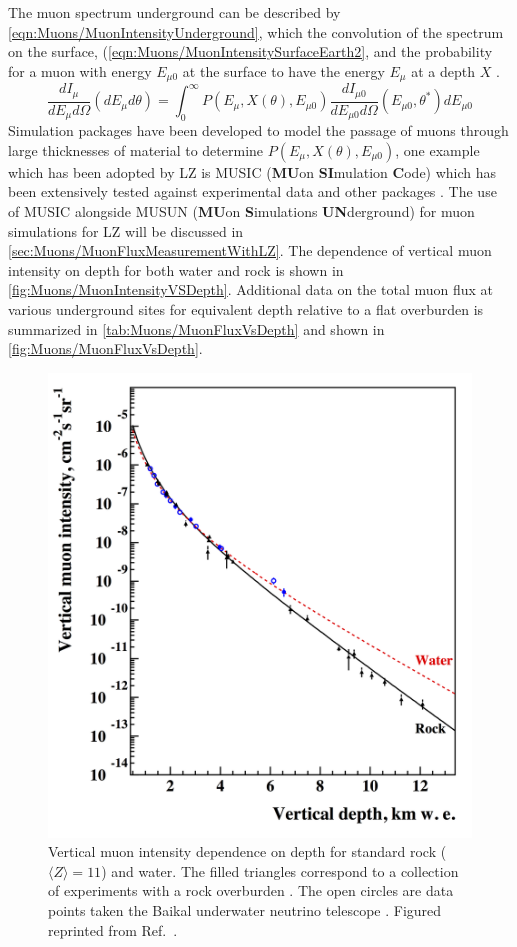 The muon spectrum underground can be described by \autoref{eqn:Muons/MuonIntensityUnderground}, which the convolution of the spectrum on the surface, (\autoref{eqn:Muons/MuonIntensitySurfaceEarth2}, and the probability for a muon with energy $E_{\mu 0}$ at the surface to have the energy $E_\mu$ at a depth $X$ \cite{musun}.
\begin{equation}\label{eqn:Muons/MuonIntensityUnderground}
    \frac{dI_\mu}{dE_\mu d\Omega}(dE_\mu d\theta)=\int^\infty_0P(E_\mu,X(\theta),E_{\mu0})\frac{dI_{\mu0}}{dE_{\mu0}d\Omega}(E_{\mu0},\theta^*)dE_{\mu 0}
\end{equation}
Simulation packages have been developed to model the passage of muons through large thicknesses of material to determine $P(E_\mu,X(\theta),E_{\mu0})$, one example which has been adopted by LZ is MUSIC (\textbf{MU}on \textbf{SI}mulation \textbf{C}ode) which has been extensively tested against experimental data and other packages \cite{musun,LVD:1998lir,PhysRevD.60.112001,Tang:2006uu,MACRO:2003qix}. The use of MUSIC alongside MUSUN (\textbf{MU}on \textbf{S}imulations \textbf{UN}derground) for muon simulations for LZ will be discussed in \autoref{sec:Muons/MuonFluxMeasurementWithLZ}.
The dependence of vertical muon intensity on depth for both water and rock is shown in \autoref{fig:Muons/MuonIntensityVSDepth}. Additional data on the total muon flux at various underground sites for equivalent depth relative to a flat overburden is summarized in \autoref{tab:Muons/MuonFluxVsDepth} and shown in \autoref{fig:Muons/MuonFluxVsDepth}.
\begin{figure}[h!]
    \centering
    \includegraphics[width=0.7\linewidth]{figures/Muons/MuonIntensityVSVertDepth.png}
    \caption[Vertical muon intensity dependence on depth for standard rock ($\langle Z\rangle=11$) and water.]{Vertical muon intensity dependence on depth for standard rock ($\langle Z\rangle=11$) and water. The filled triangles correspond to a collection of experiments with a rock overburden \cite{Kozyarivsky:1988gxn}. The open circles are data points taken the Baikal underwater neutrino telescope \cite{BAIKAL:1997iok}. Figured reprinted from Ref.~\cite{dwoodward:thesis}.}
    \label{fig:Muons/MuonIntensityVSDepth}
\end{figure}
